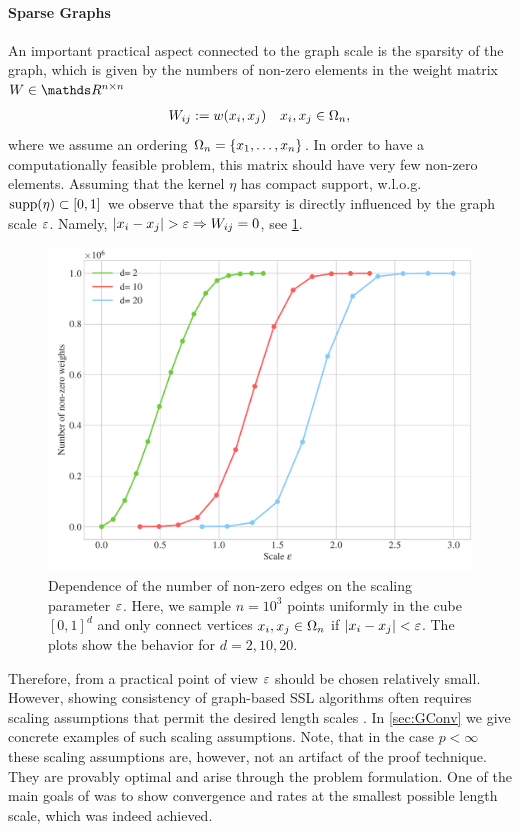 \paragraph{Sparse Graphs}
An important practical aspect connected to the graph scale is the sparsity of the graph, which is given by the numbers of non-zero elements in the weight matrix $W\in\R^{n\times n}$
%
\begin{align*}
W_{ij}:= w(x_i,x_j) \quad x_i,x_j\in\Omega_n,
\end{align*}
%
where we assume an ordering $\Omega_n=\{x_1,\ldots, x_n\}$. In order to have a computationally feasible problem, this matrix should have very few non-zero elements. Assuming that the kernel $\eta$ has compact support, w.l.o.g. $\mathrm{supp}(\eta)\subset [0,1]$ we observe that the sparsity is directly influenced by the graph scale $\gscale$. Namely, $\left|x_i-x_j\right| > \varepsilon \Rightarrow W_{ij}=0$, see \cref{fig:graphscale}.
%
%
\begin{figure}
\centering
\includegraphics[width=.5\textwidth]{code/SSL/NNZ.pdf}
\caption[Dependence of the number of non-zero edges on the scaling parameter $\gscale$.]{Dependence of the number of non-zero edges on the scaling parameter $\gscale$. Here, we sample $n=10^3$ points uniformly in the cube $[0,1]^d$ and only connect vertices $x_i,x_j\in\Omega_n$ if $\left|x_i-x_j\right| < \varepsilon$. The plots show the behavior for $d=2,10,20$.}\label{fig:graphscale}
\end{figure} 
%
%
Therefore, from a practical point of view $\gscale$ should be chosen relatively small. However, showing consistency of graph-based SSL algorithms often requires scaling assumptions that permit the desired length scales \cite{GarcSlep15, slepcev2019analysis, calder2019consistency}. In \cref{sec:GConv} we give concrete examples of such scaling assumptions. Note, that in the case $p<\infty$ these scaling assumptions are, however, not an artifact of the proof technique. They are provably optimal and arise through the problem formulation. One of the main goals of \cite{roith2022continuum, bungert2021uniform} was to show convergence and rates at the smallest possible length scale, which was indeed achieved.
